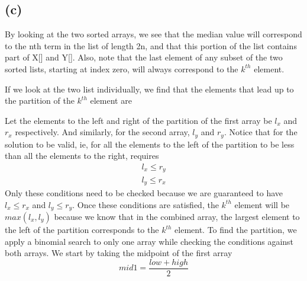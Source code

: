     	\subsection*{(c)}
    		By looking at the two sorted arrays, we see that the median value will correspond to the nth term in the list of length 2n, and that this portion of the list contains part of X[\:] and Y[\:]. 
    		Also, note that the last element of any subset of the two sorted lists, starting at index zero, will always correspond to the $k^{th}$ element. \\
    		\begin{center}\leavevmode\vbox{
    			}
    	\end{center}
    	\noindent
    		If we look at the two list individually, we find that the elements that lead up to the partition of the $k^{th}$ element are \\
    		\begin{center}\leavevmode\vbox{
    			}
    	\end{center}
    	\noindent
    	Let the elements to the left and right of the partition of the first array be $l_x$ and $r_x$ respectively. 
    	And similarly, for the second array, $l_y$ and $r_y$. 
    	Notice that for the solution to be valid, ie, for all the elements to the left of the partition to be less than all the elements to the right, requires
    	\begin{equation*}
    		\begin{split}
    			l_x \leq r_y \\
    			l_y \leq r_x
    		\end{split}
    	\end{equation*}
    	Only these conditions need to be checked because we are guaranteed to have $l_x \leq r_x$ and $l_y \leq r_y$. 
    	Once these conditions are satisfied, the $k^{th}$ element will be $max(l_x, l_y)$ because we know that in the combined array, the largest element to the left of the partition corresponds to the $k^{th}$ element. 
    	To find the partition, we apply a binomial search to only one array while checking the conditions against both arrays. 
    	We start by taking the midpoint of the first array
    	\begin{equation*}
    		mid1 = \frac{low + high}{2}
    	\end{equation*}

